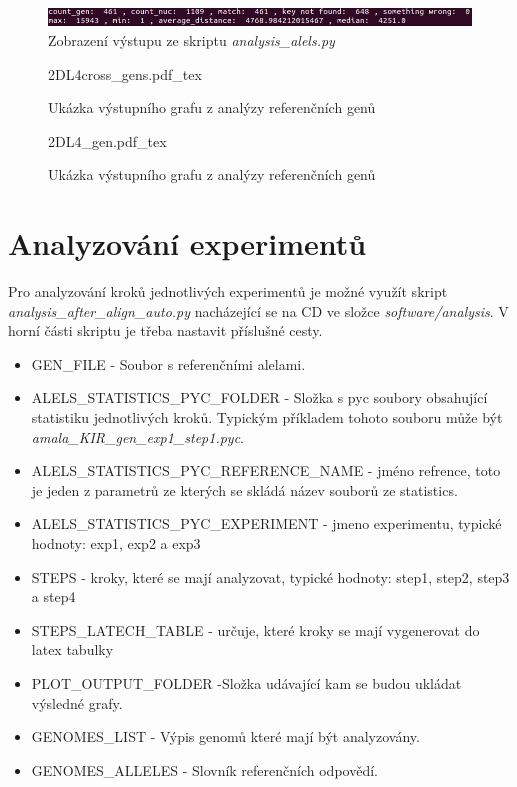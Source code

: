 \documentclass[czech,DP]{thesiskiv}
\numberwithin{equation}{section}
\begin{document}
\begin{figure}[H]		
		\centering
		\includegraphics[width=\textwidth]{./img/vystup_analyzy_refrence.png}
		\caption{Zobrazení výstupu ze skriptu \textit{analysis\_alels.py} }
		\label{fig:alels_distance_skript}
\end{figure}

\begin{figure}[H]
    \centering
    \def\svgwidth{\columnwidth}
    {2DL4cross_gens.pdf_tex} 
    \caption{Ukázka výstupního grafu z analýzy referenčních genů}
\end{figure}

\begin{figure}[H]
    \centering
    \def\svgwidth{\columnwidth}
    {2DL4_gen.pdf_tex} 
    \caption{Ukázka výstupního grafu z analýzy referenčních genů}
\end{figure}


\section{Analyzování experimentů}
Pro analyzování kroků jednotlivých experimentů je možné využít skript \textit{analysis\_after\_align\_auto.py} nacházející se na CD ve složce \textit{software/analysis}. V horní části skriptu je třeba nastavit příslušné cesty. 

\begin{itemize}
	\item GEN\_FILE - Soubor s referenčními alelami.
	\item ALELS\_STATISTICS\_PYC\_FOLDER - Složka s pyc soubory obsahující statistiku jednotlivých kroků. Typickým příkladem tohoto souboru může být \textit{amala\_KIR\_gen\_exp1\_step1.pyc}.
	\item ALELS\_STATISTICS\_PYC\_REFERENCE\_NAME - jméno refrence, toto je jeden z parametrů ze kterých se skládá název souborů ze statistics.
	\item ALELS\_STATISTICS\_PYC\_EXPERIMENT - jmeno experimentu, typické hodnoty: exp1, exp2 a exp3
	\item STEPS - kroky, které se mají analyzovat, typické hodnoty: step1, step2, step3 a step4
	\item STEPS\_LATECH\_TABLE  - určuje, které kroky se mají vygenerovat do latex tabulky
	\item PLOT\_OUTPUT\_FOLDER -Složka udávající kam se budou ukládat výsledné grafy.
	\item GENOMES\_LIST - Výpis genomů které mají být analyzovány.
	\item GENOMES\_ALLELES  - Slovník referenčních odpovědí.
\end{itemize}
\end{document}
